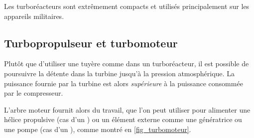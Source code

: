 		Les turboréacteurs sont extrêmement compacts et utilisés principalement sur les appareils militaires.

		

	\subsection{Turbopropulseur et turbomoteur}
	\label{ch_turboprop_turboshaft}

		Plutôt que d’utiliser une tuyère comme dans un turboréacteur, il est possible de poursuivre la détente dans la turbine jusqu’à la pression atmosphérique. La puissance fournie par la turbine est alors \emph{supérieure} à la puissance consommée par le compresseur.

		L’arbre moteur fournit alors du travail, que l’on peut utiliser pour alimenter une hélice propulsive (cas d’un ) ou un élément externe comme une génératrice ou une pompe (cas d’un ), comme montré en \cref{fig_turbomoteur}.

